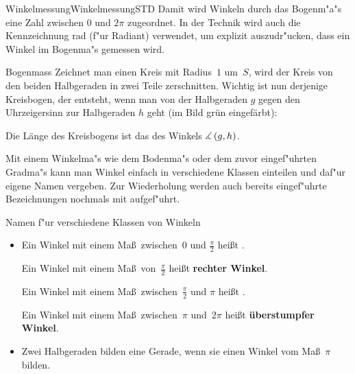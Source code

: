 \begin{MXContent}{Winkelmessung}{Winkelmessung}{STD}
Damit wird Winkeln durch das Bogenm"a"s eine Zahl zwischen $0$ und $2\pi$ 
zugeordnet. In der Technik wird auch die Kennzeichnung rad (f"ur Radiant)
verwendet, um explizit auszudr"ucken, dass ein Winkel im Bogenma"s gemessen
wird.

\begin{MXInfo}{Bogenmass}%
Zeichnet man einen Kreis mit Radius~$1$ um~$S$, wird der Kreis von den beiden 
Halbgeraden in zwei Teile zerschnitten. Wichtig ist nun derjenige Kreisbogen, 
der entsteht, wenn man von der Halbgeraden $g$ gegen den Uhrzeigersinn zur 
Halbgeraden $h$ geht (im Bild gr\"un eingef\"arbt):
\begin{center}
\end{center}
Die L\"ange des Kreisbogens ist das  
des Winkels $\measuredangle \left( g, h \right)$.
\end{MXInfo}

Mit einem Winkelma"s wie dem Bodenma"s oder dem zuvor eingef"uhrten Gradma"s
kann man Winkel einfach in verschiedene Klassen einteilen und daf"ur eigene
Namen vergeben.
Zur Wiederholung werden auch bereits eingef"uhrte Bezeichnungen nochmals 
mit aufgef"uhrt.
\begin{MXInfo}{Namen f"ur verschiedene Klassen von Winkeln}
\begin{itemize}
\item
Ein Winkel mit einem Ma\ss\ zwischen~$0$ und $\frac{\pi}{2}$ hei\ss t .
       
Ein Winkel mit einem Ma\ss\ von~$\frac{\pi}{2}$ hei\ss t \textbf{rechter Winkel}.
       
Ein Winkel mit einem Ma\ss\ zwischen~$\frac{\pi}{2}$ und $\pi$ hei\ss t .
       
Ein Winkel mit einem Ma\ss\ zwischen~$\pi$ und~$2 \pi$ hei\ss t \textbf{\"uberstumpfer Winkel}.

 \item Zwei Halbgeraden bilden eine Gerade, wenn sie einen Winkel vom Ma\ss~$\pi$ bilden.
 

\end{itemize}
\end{MXInfo}
\end{MXContent}
